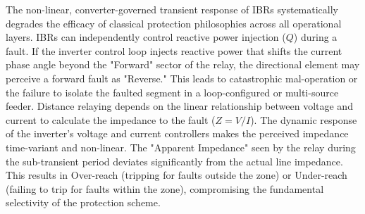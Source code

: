 The non-linear, converter-governed transient response of IBRs systematically degrades the efficacy of classical protection philosophies across all operational layers. IBRs can independently control reactive power injection ($Q$) during a fault. If the inverter control loop injects reactive power that shifts the current phase angle beyond the "Forward" sector of the relay, the directional element may perceive a forward fault as "Reverse." This leads to catastrophic mal-operation or the failure to isolate the faulted segment in a loop-configured or multi-source feeder. Distance relaying depends on the linear relationship between voltage and current to calculate the impedance to the fault ($Z = V/I$). The dynamic response of the inverter's voltage and current controllers makes the perceived impedance time-variant and non-linear. The "Apparent Impedance" seen by the relay during the sub-transient period deviates significantly from the actual line impedance. This results in Over-reach (tripping for faults outside the zone) or Under-reach (failing to trip for faults within the zone), compromising the fundamental selectivity of the protection scheme.
 




